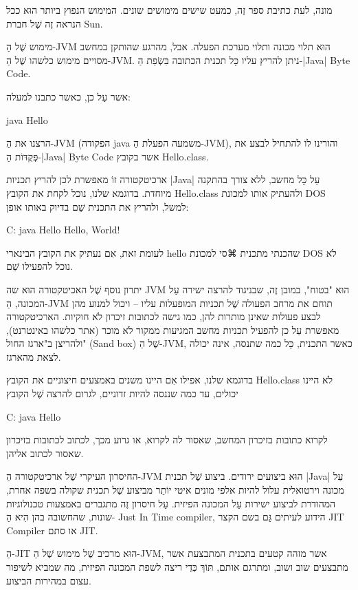 מונה, לעת כתיבת ספר זֶה, כמעט שישים מימושים שונים. המימוש הנפוץ ביותר הוּא ככל
הנראה זֶה שֶׁל חברת Sun.

מימוש שֶׁל הַ-JVM הוּא תלוי מכונה ותלוי מערכת הפעלה. אבל, מהרגע שהותקן במחשב
מסויים מימוש כלשהו שֶׁל הַ-JVM. ניתן להריץ עליו כָּל תכנית הכתובה
בִּשְׂפַת הַ-|Java| Byte Code.

אשר עַל כן, כאשר כתבנו למעלה:

java Hello
\END

הרצנו את הַ-JVM (הפקודה java משמעה הפעלת הַ-JVM), והורינו לו להתחיל לבצע
את פְּקֻדּוֹת הַ-|Java| Byte Code אשר בקובץ Hello.class.

ארכיטקטורה זוֹ מאפשרת לכן להריץ תכניות \E|Java| עַל כָּל מחשב, ללא צורך בהתקנה
מיוחדת. בדוגמא שלנו, נוכל לקחת את הקובץ Hello.class ולהעתיק אותו למכונת DOS
למשל, ולהריץ את התכנית שֵׁם בדיוק באותו אופן:

\begin{NONE}
C:\> java Hello
Hello, World!
\end{NONE}

לעומת זאת, אִם נעתיק את הקובץ הבינארי hello שהכנתי מתכנית ⌘סי למכונת DOS לֹא
נוכל להפעילו שֵׁם.

יתרון נוסף שֶׁל האכיטקטורה הוּא שה JVM הוּא "בטוח", במובן זֶה, שבניגוד להרצה
ישירה עַל המכונה, הַ-JVM תוחם את מרחב הפעולה שֶׁל תכניות המופעלות עליו –
ויכול למנוע מהן לבצע פעולות שאינן מותרות להן, כמו גישה לכתובות זיכרון לֹא
חוקיות. הארכיטקטורה מאפשרת עַל כן להפעיל תכניות מחשב המגיעות ממקור לֹא
מוכר (אתר כלשהו באינטרנט), ולהריצן ב"ארגז החול" (Sand box) שֶׁל הַ-JVM, כאשר
התכנית, כָּל כמה שתנסה, אינה יכולה לצאת מהארגז.

בדוגמא שלנו, אפילו אִם היינו משנים באמצעים חיצוניים את הקובץ Hello.class לֹא
היינו יכולים, עד כמה שננסה להיות זדוניים, לגרום להרצה שֶׁל הקובץ
\begin{NONE}
C:\> java Hello
\end{NONE}

לקרוא כתובות בזיכרון המחשב, שאסור לה לקרוא, או גרוע מכך, לכתוב לכתובות בזיכרון
שאסור לכתוב אליהן.

החיסרון העיקרי שֶׁל ארכיטקטורה הַ-JVM הוּא ביצועים ירודים. ביצוע שֶׁל תכנית
|Java| עַל מכונה וירטואלית עלול להיות אלפי מונים איטי יוֹתֵר מביצוע שֶׁל
תכנית שקולה בשפה אחרת, המהודרת לביצוע ישירות עַל המכונה הפיזית. עַל חיסרון
זֶה מתגברים באמצעות טכנולוגיות שונות, שהחשובה בהן הִיא הַ- Just In Time
compiler, הידוע לעיתים גַּם בשם הקצר JIT Compiler או סתם JIT.

הַ-JIT הוּא מרכיב שֶׁל מימוש שֶׁל הַ-JVM, אשר מזהה קטעים בתכנית המתבצעת
אשר מתבצעים שוב ושוב, ומתרגם אותם, תּוֹךְ כְּדֵי ריצה לשפת המכונה הפיזית, מה
שמביא לשיפור עצום במהירות הביצוע.

